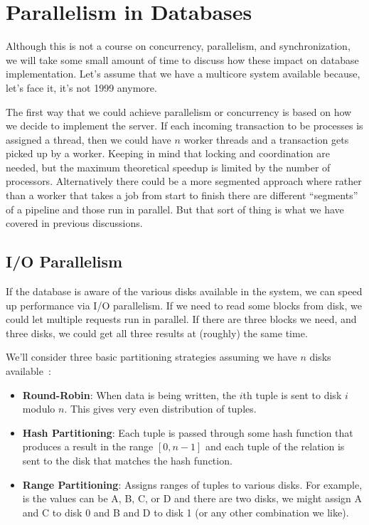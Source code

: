 




\section*{Parallelism in Databases}

Although this is not a course on concurrency, parallelism, and synchronization, we will take some small amount of time to discuss how these impact on database implementation.  Let's assume that we have a multicore system available because, let's face it, it's not 1999 anymore.

The first way that we could achieve parallelism or concurrency is based on how we decide to implement the server. If each incoming transaction to be processes is assigned a thread, then we could have $n$ worker threads and a transaction gets picked up by a worker. Keeping in mind that locking and coordination are needed, but the maximum theoretical speedup is limited by the number of processors. Alternatively there could be a more segmented approach where rather than a worker that takes a job from start to finish there are different ``segments'' of a pipeline and those run in parallel. But that sort of thing is what we have covered in previous discussions. 


\subsection*{I/O Parallelism} If the database is aware of the various disks available in the system, we can speed up performance via I/O parallelism. If we need to read some blocks from disk, we could let multiple requests run in parallel. If there are three blocks we need, and three disks, we could get all three results at (roughly) the same time. 

We'll consider three basic partitioning strategies assuming we have $n$ disks available~\cite{dsc}:
\begin{itemize}
	\item \textbf{Round-Robin}: When data is being written, the $i$th tuple is sent to disk $i$ modulo $n$. This gives very even distribution of tuples.
	\item \textbf{Hash Partitioning}: Each tuple is passed through some hash function that produces a result in the range $[0, n-1]$ and each tuple of the relation is sent to the disk that matches the hash function.
	\item \textbf{Range Partitioning}: Assigns ranges of tuples to various disks. For example, is the values can be A, B, C, or D and there are two disks, we might assign A and C to disk 0 and B and D to disk 1 (or any other combination we like).
\end{itemize}

